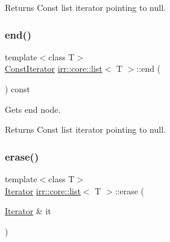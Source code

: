 \begin{DoxyReturn}{Returns}
Const list iterator pointing to null. 
\end{DoxyReturn}
\mbox{\label{classirr_1_1core_1_1list_a6209ac37decfb5f29da921ea40b46e10}} 
\subsubsection{\texorpdfstring{end()}{end()}\hspace{0.1cm}{\footnotesize\ttfamily [4/4]}}
{\footnotesize\ttfamily template$<$class T$>$ \\
\hyperlink{classirr_1_1core_1_1list_1_1ConstIterator}{Const\+Iterator} \hyperlink{classirr_1_1core_1_1list}{irr\+::core\+::list}$<$ T $>$\+::end (\begin{DoxyParamCaption}{ }\end{DoxyParamCaption}) const\hspace{0.3cm}{\ttfamily [inline]}}



Gets end node. 

\begin{DoxyReturn}{Returns}
Const list iterator pointing to null. 
\end{DoxyReturn}
\mbox{\label{classirr_1_1core_1_1list_a407935fc79a35ce7caa19e4f6ce25c3f}} 
\subsubsection{\texorpdfstring{erase()}{erase()}\hspace{0.1cm}{\footnotesize\ttfamily [1/2]}}
{\footnotesize\ttfamily template$<$class T$>$ \\
\hyperlink{classirr_1_1core_1_1list_1_1Iterator}{Iterator} \hyperlink{classirr_1_1core_1_1list}{irr\+::core\+::list}$<$ T $>$\+::erase (\begin{DoxyParamCaption}\item[{\hyperlink{classirr_1_1core_1_1list_1_1Iterator}{Iterator} \&}]{it }\end{DoxyParamCaption})\hspace{0.3cm}{\ttfamily [inline]}}



